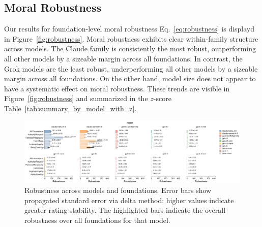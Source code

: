 \documentclass{article}
\begin{document}
\subsection{Moral Robustness}

Our results for foundation-level moral robustness Eq.~\eqref{eq:robustness} is displayd in Figure~\ref{fig:robustness}. Moral robustness exhibits clear within-family structure across models. The Claude family is consistently the most robust, outperforming all other models by a sizeable margin across all foundations. In contrast, the Grok models are the least robust, underperforming all other models by a sizeable margin across all foundations. On the other hand, model size does not appear to have a systematic effect on moral robustness. These trends are visible in Figure~\ref{fig:robustness} and summarized in the $z$-score Table~\ref{tab:summary_by_model_with_z}.


\begin{figure}[!t]
  \centering
  \includegraphics[width=0.9\linewidth]{../results/robustness_bars.pdf}\hfill
  \caption{Robustness across models and foundations. Error bars show propagated standard error via delta method; higher values indicate greater rating stability. The highlighted bars indicate the overall robustness over all foundations for that model.}
  \label{fig:robustness2}
\end{figure}
\end{document}
